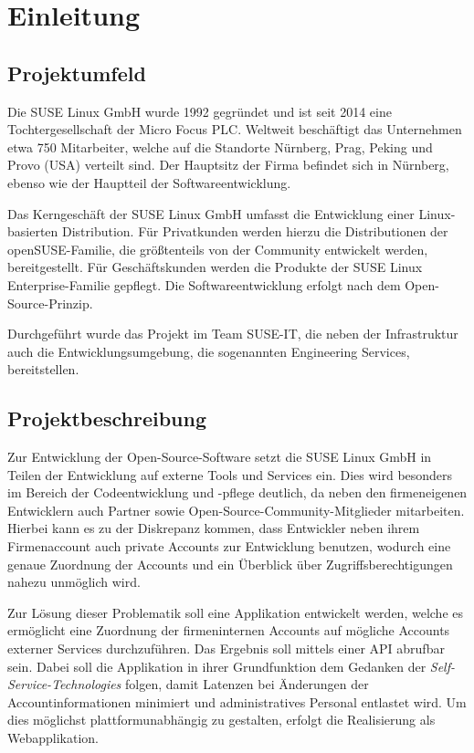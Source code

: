 \section{Einleitung}
\label{sec:Einleitung}

\subsection{Projektumfeld}
\label{sec:Projektumfeld}
Die SUSE Linux GmbH wurde 1992 gegründet und ist seit 2014 eine Tochtergesellschaft der Micro Focus
PLC. Weltweit beschäftigt das Unternehmen etwa 750 Mitarbeiter, welche auf die Standorte Nürnberg,
Prag, Peking und Provo (USA) verteilt sind. Der Hauptsitz der Firma befindet sich in Nürnberg,
ebenso wie der Hauptteil der Softwareentwicklung.

Das Kerngeschäft der SUSE Linux GmbH umfasst die Entwicklung einer Linux-basierten Distribution.
Für Privatkunden werden hierzu die Distributionen der openSUSE-Familie, die größtenteils von der
Community entwickelt werden, bereitgestellt. Für Geschäftskunden werden die Produkte der SUSE Linux
Enterprise-Familie gepflegt. Die Softwareentwicklung erfolgt nach dem Open-Source-Prinzip.

Durchgeführt wurde das Projekt im Team SUSE-IT, die neben der Infrastruktur auch die
Entwicklungsumgebung, die sogenannten Engineering Services, bereitstellen.

\subsection{Projektbeschreibung}
\label{sec:Projektbeschreibung}
Zur Entwicklung der Open-Source-Software setzt die SUSE Linux GmbH in Teilen der Entwicklung
auf externe Tools und Services ein. Dies wird besonders im Bereich der Codeentwicklung und -pflege
deutlich, da neben den firmeneigenen Entwicklern auch Partner sowie Open-Source-Community-Mitglieder
mitarbeiten. Hierbei kann es zu der Diskrepanz kommen, dass Entwickler neben ihrem Firmenaccount
auch private Accounts zur Entwicklung benutzen, wodurch eine genaue Zuordnung der Accounts und
ein Überblick über Zugriffsberechtigungen nahezu unmöglich wird.

Zur Lösung dieser Problematik soll eine Applikation entwickelt werden, welche es ermöglicht
eine Zuordnung der firmeninternen Accounts auf mögliche Accounts externer Services durchzuführen.
Das Ergebnis soll mittels einer \acs{API} abrufbar sein.
Dabei soll die Applikation in ihrer Grundfunktion dem Gedanken der \textit{Self-Service-Technologies} folgen,
damit Latenzen bei Änderungen der Accountinformationen minimiert und administratives Personal
entlastet wird. Um dies möglichst plattformunabhängig zu gestalten, erfolgt die Realisierung als
Webapplikation.

